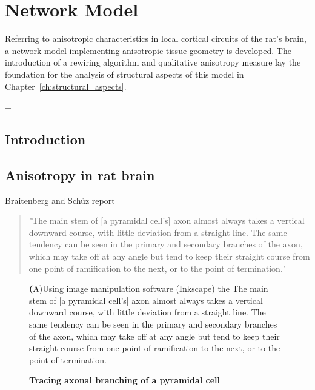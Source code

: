 \chapter{Network Model}\label{ch:Network Model} 

Referring to anisotropic characteristics in local cortical circuits of
the rat's brain, a network model implementing anisotropic tissue
geometry is developed. The introduction of a rewiring algorithm and
qualitative anisotropy measure %
lay the foundation for the analysis of structural aspects of this
model in Chapter~\ref{ch:structural_aspects}.

\parskip = \baselineskip %
\setlength{\parindent}{0pt}

\section{Introduction}\label{sec:intro_model}

\section{Anisotropy in rat brain}\label{sec:biol_anisotropy}

Braitenberg and Schüz report \parencite{Braitenberg_Cortex}
\begin{quote}
"The main stem of [a pyramidal cell's] axon almost always takes a
vertical downward course, with little deviation from a straight
line. The same tendency can be seen in the primary and secondary
branches of the axon, which may take off at any angle but tend to keep
their straight course from one point of ramification to the next, or
to the point of termination."
\end{quote}



\vspace{0.5cm}
\begin{figure}[h] 
  \centering 

  \caption{\textbf{Tracing axonal branching of a pyramidal cell} }%
  \small
  \textbf(A)Using image manipulation software (Inkscape) the The main stem of [a pyramidal cell's] axon almost always takes a
vertical downward course, with little deviation from a straight
line. The same tendency can be seen in the primary and secondary
branches of the axon, which may take off at any angle but tend to keep
their straight course from one point of ramification to the next, or
to the point of termination.
  \textcite{Romand2011}
  \label{fig:romand_traced}
\end{figure}



